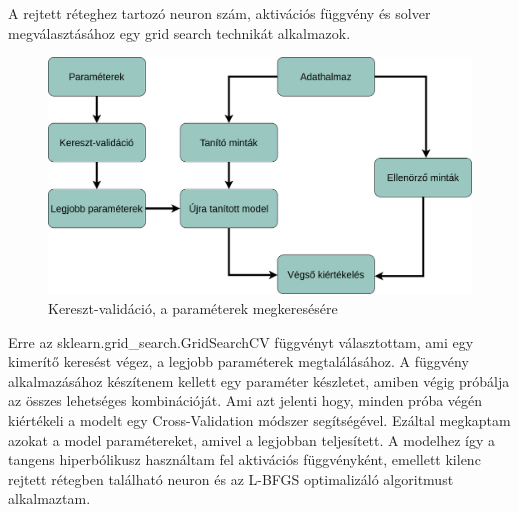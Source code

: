 A rejtett réteghez tartozó neuron szám, aktivációs függvény és solver megválasztásához egy grid search technikát alkalmazok.
\begin{figure}[h!]
\centering
\includegraphics[scale=0.3]{images/gridSearch.png}
\caption{Kereszt-validáció, a paraméterek megkeresésére}
\label{fig:neuralnetwork}
\end{figure}
Erre az sklearn.grid\_search.GridSearchCV függvényt választottam, ami egy kimerítő keresést végez, a legjobb paraméterek megtalálásához. A függvény alkalmazásához készítenem kellett egy paraméter készletet, amiben végig próbálja az összes lehetséges kombinációját. Ami azt jelenti hogy, minden próba végén kiértékeli a modelt egy Cross-Validation módszer segítségével. Ezáltal megkaptam azokat a model paramétereket, amivel a legjobban teljesített.
A modelhez így a tangens hiperbólikusz használtam fel aktivációs függvényként, emellett kilenc rejtett rétegben található neuron és az L-BFGS optimalizáló algoritmust alkalmaztam.

